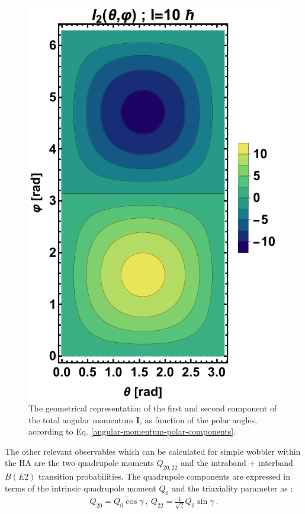 \begin{figure}
    \includegraphics[scale=0.66]{Chapters/Figures/angular_components-TRM-2.pdf}
    \caption{The geometrical representation of the first and second component of the total angular momentum $\mathbf{I}$, as function of the polar angles, according to Eq. \ref{angular-momentum-polar-components}.}
    \label{figs-angular-momentum-components-polar}
\end{figure}

The other relevant observables which can be calculated for simple wobbler within the HA are the two quadrupole moments $Q_{20,22}$ and the intraband + interband $B(E2)$ transition probabilities. The quadrupole components are expressed in terms of the intrinsic quadrupole moment $Q_0$ and the triaxiality parameter as \cite{shoji2006microscopic}:
\begin{align}
    Q_{20}=Q_0\cos\gamma\ ,\ Q_{22}=\frac{1}{\sqrt{2}}Q_0\sin\gamma\ .
\end{align}


